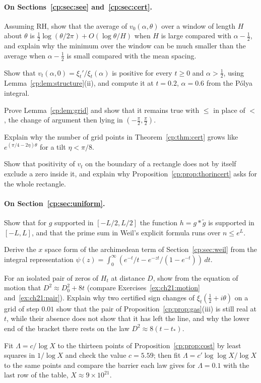 \paragraph{On Sections~\ref{cp:sec:see} and~\ref{cp:sec:cert}.}
\begin{exercises}
\item\label{ex:cp:mean} Assuming RH, show that the average of $v_0(\alpha,\theta)$ over a window of length $H$ about $\theta$ is $\frac12\log(\theta/2\pi)+O(\log\theta/H)$ when $H$ is large compared with $\alpha-\frac12$, and explain why the minimum over the window can be much smaller than the average when $\alpha-\frac12$ is small compared with the mean spacing.
\item Show that $v_t(\alpha,0)=\xi_t'/\xi_t(\alpha)$ is positive for every $t\ge0$ and $\alpha>\frac12$, using Lemma~\ref{cp:lem:structure}(ii), and compute it at $t=0.2$, $\alpha=0.6$ from the P\'olya integral.
\item\label{ex:cp:grid} Prove Lemma~\ref{cp:lem:grid} and show that it remains true with $\le$ in place of $<$, the change of argument then lying in $(-\frac\pi2,\frac\pi2)$.
\item Explain why the number of grid points in Theorem~\ref{cp:thm:cert} grows like $e^{(\pi/4-2\eta)\theta}$ for a tilt $\eta<\pi/8$.
\item Show that positivity of $v_t$ on the boundary of a rectangle does not by itself exclude a zero inside it, and explain why Proposition~\ref{cp:prop:thorincert} asks for the whole rectangle.
\end{exercises}

\paragraph{On Section~\ref{cp:sec:uniform}.}
\begin{exercises}
\item Show that for $g$ supported in $[-L/2,L/2]$ the function $h=g*\tilde g$ is supported in $[-L,L]$, and that the prime sum in Weil's explicit formula runs over $n\le e^L$.
\item Derive the $x$ space form of the archimedean term of Section~\ref{cp:sec:weil} from the integral representation $\psi(z)=\int_0^\infty(e^{-t}/t-e^{-zt}/(1-e^{-t}))\,dt$.
\item For an isolated pair of zeros of $H_t$ at distance $D$, show from the equation of motion that $D^2\approx D_0^2+8t$ (compare Exercises~\ref{ex:ch21:motion} and~\ref{ex:ch21:pair}). Explain why two certified sign changes of $\xi_t(\frac12+i\theta)$ on a grid of step $0.01$ show that the pair of Proposition~\ref{cp:prop:gas}(iii) is still real at $t$, while their absence does not show that it has left the line, and why the lower end of the bracket there rests on the law $D^2\approx8(t-t_*)$.
\item Fit $\Lambda=c/\log X$ to the thirteen points of Proposition~\ref{cp:prop:cost} by least squares in $1/\log X$ and check the value $c=5.59$; then fit $\Lambda=c'\log\log X/\log X$ to the same points and compare the barrier each law gives for $\Lambda=0.1$ with the last row of the table, $X\approx9\times10^{21}$.
\end{exercises}
